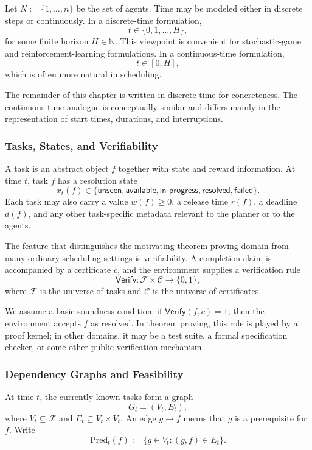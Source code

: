 Let \(N := \{1,\dots,n\}\) be the set of agents. Time may be modeled either in discrete steps or continuously. In a discrete-time formulation,
\[
  t \in \{0,1,\dots,H\},
\]
for some finite horizon \(H \in \mathbb{N}\). This viewpoint is convenient for stochastic-game and reinforcement-learning formulations. In a continuous-time formulation,
\[
  t \in [0,H],
\]
which is often more natural in scheduling.

The remainder of this chapter is written in discrete time for concreteness. The continuous-time analogue is conceptually similar and differs mainly in the representation of start times, durations, and interruptions.

\subsubsection{Tasks, States, and Verifiability}

A task is an abstract object \(f\) together with state and reward information. At time \(t\), task \(f\) has a resolution state
\[
  x_t(f) \in \{\mathsf{unseen},\mathsf{available},\mathsf{in\_progress},\mathsf{resolved},\mathsf{failed}\}.
\]
Each task may also carry a value \(w(f) \ge 0\), a release time \(r(f)\), a deadline \(d(f)\), and any other task-specific metadata relevant to the planner or to the agents.

The feature that distinguishes the motivating theorem-proving domain from many ordinary scheduling settings is verifiability. A completion claim is accompanied by a certificate \(c\), and the environment supplies a verification rule
\[
  \mathsf{Verify} : \mathcal{F} \times \mathcal{C} \to \{0,1\},
\]
where \(\mathcal{F}\) is the universe of tasks and \(\mathcal{C}\) is the universe of certificates.

We assume a basic soundness condition: if \(\mathsf{Verify}(f,c)=1\), then the environment accepts \(f\) as resolved. In theorem proving, this role is played by a proof kernel; in other domains, it may be a test suite, a formal specification checker, or some other public verification mechanism.

\subsubsection{Dependency Graphs and Feasibility}

At time \(t\), the currently known tasks form a graph
\[
  G_t = (V_t, E_t),
\]
where \(V_t \subseteq \mathcal{F}\) and \(E_t \subseteq V_t \times V_t\). An edge \(g \to f\) means that \(g\) is a prerequisite for \(f\). Write
\[
  \mathrm{Pred}_t(f) := \{g \in V_t : (g,f)\in E_t\}.
\]

